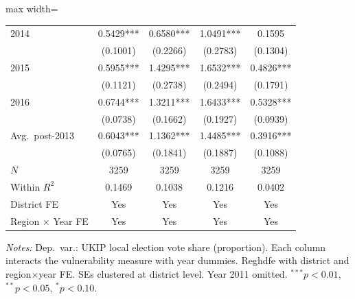\begin{table}[htbp]
\begin{adjustbox}{max width=\textwidth}
\begin{tabular}{lcccc}
2014 & 0.5429*** & 0.6580*** & 1.0491*** & 0.1595 \\
 & (0.1001) & (0.2266) & (0.2783) & (0.1304) \\
2015 & 0.5955*** & 1.4295*** & 1.6532*** & 0.4826*** \\
 & (0.1121) & (0.2738) & (0.2494) & (0.1791) \\
2016 & 0.6744*** & 1.3211*** & 1.6433*** & 0.5328*** \\
 & (0.0738) & (0.1662) & (0.1927) & (0.0939) \\
\midrule
Avg.\ post-2013 & 0.6043*** & 1.1362*** & 1.4485*** & 0.3916*** \\
 & (0.0765) & (0.1841) & (0.1887) & (0.1088) \\
\midrule
$N$ & 3259 & 3259 & 3259 & 3259 \\
Within $R^2$ & 0.1469 & 0.1038 & 0.1216 & 0.0402 \\
\midrule
District FE & Yes & Yes & Yes & Yes \\
Region $\times$ Year FE & Yes & Yes & Yes & Yes \\
\bottomrule
\end{tabular}
\end{adjustbox}
\parbox{\textwidth}{\footnotesize\textit{Notes:} Dep.\ var.: UKIP local election vote share (proportion). Each column interacts the vulnerability measure with year dummies. Reghdfe with district and region$\times$year FE. SEs clustered at district level. Year 2011 omitted. $^{***}p<0.01$, $^{**}p<0.05$, $^{*}p<0.10$.}
\end{table}